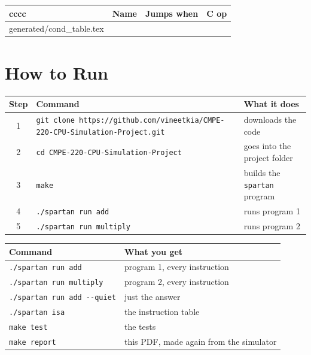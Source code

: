 \documentclass[10pt]{article}
\makeatletter
\newenvironment{tablehere}{\par\vspace{8pt}\noindent\begin{minipage}{\linewidth}\centering\def\@captype{table}}{\end{minipage}\par\vspace{8pt}}
\let\rawinput\@@input
\makeatother
\begin{document}
\begin{tablehere}
\caption{Branch conditions (\texttt{cccc} in Bcc)}
\label{tab:cond}
\small
\begin{tabular}{@{}llll@{}}
\toprule
cccc & Name & Jumps when & C op\\
\midrule
\rawinput generated/cond_table.tex
\bottomrule
\end{tabular}
\end{tablehere}

\clearpage
\section{How to Run}\label{sec:run}

\begin{tablehere}
\caption{Getting the code and running it. Needs \texttt{git}, a C compiler and \texttt{make}.}
\label{tab:getcode}
\small
\begin{tabular}{@{}cll@{}}
\toprule
Step & Command & What it does \\
\midrule
1 & {\footnotesize\texttt{git clone https://github.com/vineetkia/CMPE-220-CPU-Simulation-Project.git}} & downloads the code \\
2 & \texttt{cd CMPE-220-CPU-Simulation-Project} & goes into the project folder \\
3 & \texttt{make} & builds the \texttt{spartan} program \\
4 & \texttt{./spartan run add} & runs program 1 \\
5 & \texttt{./spartan run multiply} & runs program 2 \\
\bottomrule
\end{tabular}
\end{tablehere}

\begin{tablehere}
\caption{All commands}
\label{tab:commands}
\small
\begin{tabular}{@{}ll@{}}
\toprule
Command & What you get \\
\midrule
\texttt{./spartan run add} & program 1, every instruction \\
\texttt{./spartan run multiply} & program 2, every instruction \\
\texttt{./spartan run add -{}-quiet} & just the answer \\
\texttt{./spartan isa} & the instruction table \\
\texttt{make test} & the tests \\
\texttt{make report} & this PDF, made again from the simulator \\
\bottomrule
\end{tabular}
\end{tablehere}
\end{document}
